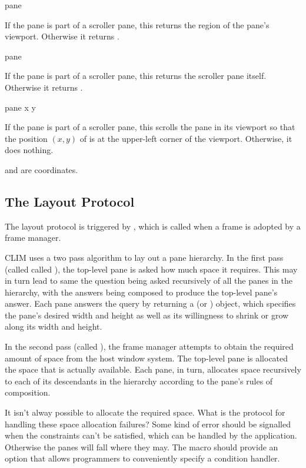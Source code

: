  {pane}

If the pane  is part of a scroller pane, this returns the region of
the pane's viewport.  Otherwise it returns .

 {pane}

If the pane  is part of a scroller pane, this returns the scroller
pane itself.  Otherwise it returns .

 {pane x y}

If the pane  is part of a scroller pane, this scrolls the pane in its
viewport so that the position $(x,y)$ of  is at the upper-left corner
of the viewport.  Otherwise, it does nothing.

 and  are coordinates.


\subsection {The Layout Protocol\label{layout-protocol}}

The layout protocol is triggered by , which is called when a
frame is adopted by a frame manager.

CLIM uses a two pass algorithm to lay out a pane hierarchy.  In the first pass
(called called ), the top-level pane is asked how
much space it requires.  This may in turn lead to same the question being asked
recursively of all the panes in the hierarchy, with the answers being composed
to produce the top-level pane's answer.  Each pane answers the query by
returning a  (or ) object,
which specifies the pane's desired width and height as well as its willingness
to shrink or grow along its width and height.

In the second pass (called ), the frame manager
attempts to obtain the required amount of space from the host window system.
The top-level pane is allocated the space that is actually available.  Each
pane, in turn, allocates space recursively to each of its descendants in the
hierarchy according to the pane's rules of composition.

 {It isn't alway possible to allocate the required space.  What is
the protocol for handling these space allocation failures?  Some kind of error
should be signalled when the constraints can't be satisfied, which can be
handled by the application.  Otherwise the panes will fall where they may.  The
 macro should provide an option that allows
programmers to conveniently specify a condition handler.}

